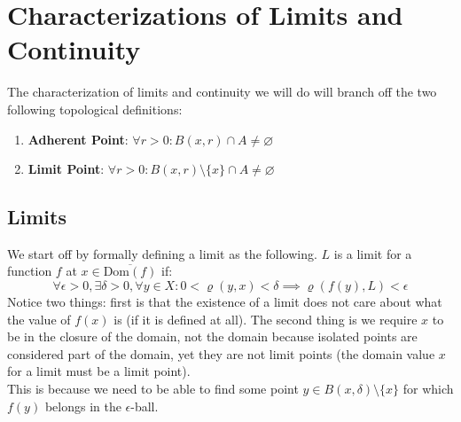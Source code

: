 \documentclass[10pt,letterpaper]{article} %
\author{Omkar Tasgaonkar}
\begin{document}
\tableofcontents
\newpage
\thispagestyle{firstpage}

\section{Characterizations of Limits and Continuity}
The characterization of limits and continuity we will do will branch off the two following topological definitions:
\begin{enumerate}
\item \textbf{Adherent Point}: $\forall r > 0: B(x, r) \cap A \neq \varnothing$
\item \textbf{Limit Point}: $\forall r > 0: B(x, r)\setminus \{x\} \cap A \neq \varnothing$
\end{enumerate}

\subsection{Limits}
We start off by formally defining a limit as the following. $L$ is a limit for a function $f$ at $x \in \overline{\text{Dom}(f)}$ if:
\begin{equation*}
  \forall \epsilon > 0, \exists \delta > 0, \forall y \in X: 0 < \varrho(y, x) < \delta \implies \varrho(f(y), L) < \epsilon
\end{equation*}
Notice two things: first is that the existence of a limit does not care about what the value of $f(x)$ is (if it is defined at all). The second thing is we require $x$ to be in the closure of the domain, not the domain because isolated points are considered part of the domain, yet they are not limit points (the domain value $x$ for a limit must be a limit point).\\

This is because we need to be able to find some point $y \in B(x, \delta) \setminus \{x\}$ for which $f(y)$ belongs in the $\epsilon$-ball.\\
\end{document}
